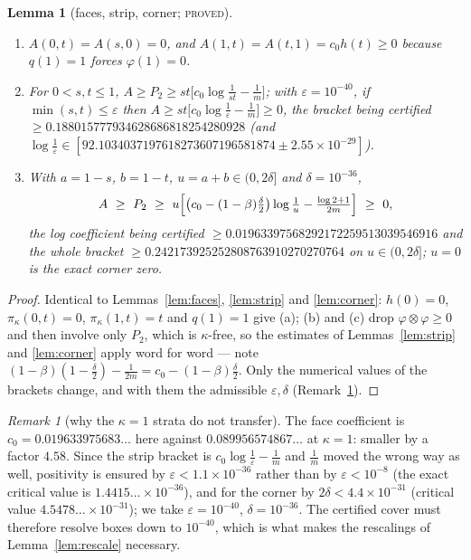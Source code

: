 \documentclass[11pt]{article}
\theoremstyle{plain}
\newtheorem{lemma}[theorem]{Lemma}
\theoremstyle{definition}
\theoremstyle{remark}
\newtheorem{remark}[theorem]{Remark}
\newcommand{\lbl}[1]{\textsc{#1}}
\begin{document}
\begin{lemma}[faces, strip, corner; \lbl{proved}]\label{lem:scaled-strata}
\leavevmode
\begin{enumerate}[label=(\alph*),nosep]
\item $A(0,t)=A(s,0)=0$, and $A(1,t)=A(t,1)=c_0h(t)\ge0$ because
$q(1)=1$ forces $\varphi(1)=0$.
\item For $0<s,t\le1$, $A\ge P_2\ge st\bigl[c_0\log\frac1{st}-\frac1m\bigr]$;
with $\varepsilon=10^{-40}$, if $\min(s,t)\le\varepsilon$ then
$A\ge st\bigl[c_0\log\frac1\varepsilon-\frac1m\bigr]\ge0$, the bracket being
certified $\ge0.188015777934628686818254280928$ (and
$\log\frac1\varepsilon\in[92.1034037197618273607196581874\pm2.55\times10^{-29}]$).
\item With $a=1-s$, $b=1-t$, $u=a+b\in(0,2\delta]$ and $\delta=10^{-36}$,
\[
  A\ \ge\ P_2\ \ge\ u\Bigl[\bigl(c_0-(1-\beta)\tfrac\delta2\bigr)\log\tfrac1u-\tfrac{\log2+1}{2m}\Bigr]\ \ge\ 0,
\]
the log coefficient being certified
$\ge0.01963397568292172259513039546916$ and the whole bracket
$\ge0.242173925252808763910270270764$ on $u\in(0,2\delta]$; $u=0$ is the exact
corner zero.
\end{enumerate}
\end{lemma}
\begin{proof}
Identical to Lemmas~\ref{lem:faces}, \ref{lem:strip} and \ref{lem:corner}:
$h(0)=0$, $\pi_\kappa(0,t)=0$, $\pi_\kappa(1,t)=t$ and $q(1)=1$ give (a);
(b) and (c) drop $\varphi\otimes\varphi\ge0$ and then involve only $P_2$,
which is $\kappa$-free, so the estimates of Lemmas~\ref{lem:strip} and
\ref{lem:corner} apply word for word --- note
$(1-\beta)(1-\tfrac\delta2)-\tfrac1{2m}=c_0-(1-\beta)\tfrac\delta2$.  Only the
numerical values of the brackets change, and with them the admissible
$\varepsilon,\delta$ (Remark~\ref{rem:strata}).
\end{proof}

\begin{remark}[why the $\kappa=1$ strata do not transfer]\label{rem:strata}
The face coefficient is $c_0=0.019633975683\ldots$ here against
$0.089956574867\ldots$ at $\kappa=1$: smaller by a factor $4.58$.  Since the
strip bracket is $c_0\log\frac1\varepsilon-\frac1m$ and $\frac1m$ moved the
wrong way as well, positivity is ensured by
$\varepsilon<1.1\times10^{-36}$ rather than by $\varepsilon<10^{-8}$ (the
exact critical value is $1.4415\ldots\times10^{-36}$), and for the corner by
$2\delta<4.4\times10^{-31}$ (critical value $4.5478\ldots\times10^{-31}$);
we take $\varepsilon=10^{-40}$,
$\delta=10^{-36}$.  The certified cover must therefore resolve boxes down to
$10^{-40}$, which is what makes the rescalings of
Lemma~\ref{lem:rescale} necessary.
\end{remark}
\end{document}
